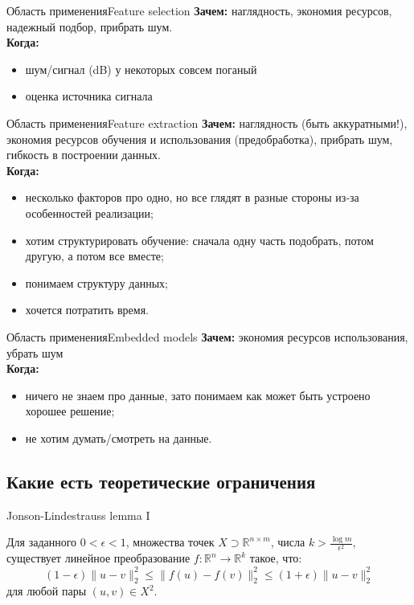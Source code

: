 \documentclass[14pt, fleqn, xcolor={dvipsnames, table}]{beamer}
\begin{document}
\begin{frame}{Область применения}{Feature selection}
\textbf{Зачем:} наглядность, экономия ресурсов, надежный подбор, прибрать шум. \\
\textbf{Когда:}
\begin{itemize}
  \item шум/сигнал (dB) у некоторых совсем поганый
  \item оценка источника сигнала
\end{itemize}
\end{frame}

\begin{frame}{Область применения}{Feature extraction}
\textbf{Зачем:} наглядность (быть аккуратными!), экономия ресурсов обучения и использования (предобработка), прибрать шум, гибкость в построении данных. \\
\textbf{Когда:}
\begin{itemize}
  \item несколько факторов про одно, но все глядят в разные стороны из-за особенностей реализации;
  \item хотим структурировать обучение: сначала одну часть подобрать, потом другую, а потом все вместе;
  \item понимаем структуру данных;
  \item хочется потратить время.
\end{itemize}
\end{frame}

\begin{frame}{Область применения}{Embedded models}
\textbf{Зачем:} экономия ресурсов использования, убрать шум \\
\textbf{Когда:}
\begin{itemize}
  \item ничего не знаем про данные, зато понимаем как может быть устроено хорошее решение;
  \item не хотим думать/смотреть на данные.
\end{itemize}
\end{frame}

\subsection{Какие есть теоретические ограничения}
\begin{frame}{Jonson-Lindestrauss lemma I}
\begin{theorem}{}
Для заданного $0<\epsilon<1$, множества точек $X \supset \mathbb{R}^{n\times m}$, числа $k > \frac{\log m}{\epsilon^2}$, существует линейное преобразование $f: \mathbb{R}^n \to \mathbb{R}^k$ такое, что:
$$
(1 - \epsilon) \|u - v\|_2^2 \le \|f(u) - f(v)\|_2^2 \le (1 + \epsilon) \|u - v\|_2^2
$$
для любой пары $(u,v) \in X^2$.
\end{theorem}
\end{frame}
\end{document}
